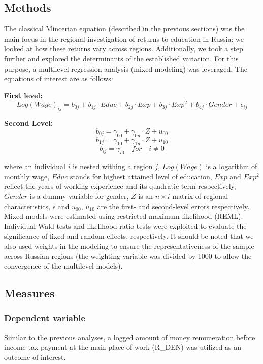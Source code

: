 \documentclass[12pt,a4paper]{article}
\numberwithin{equation}{section}
\begin{document}
\subsection*{Methods}

The classical Mincerian equation (described in the previous sections) was the main focus in the regional investigation of returns to education in Russia: we looked at how these returns vary across regions. Additionally, we took a step further and explored the determinants of the established variation. For this purpose, a multilevel regression analysis (mixed modeling) was leveraged. The equations of interest are as follows:

\textbf{First level:}
$$Log(Wage)_{ij} = b_{0j} + b_{1j}\cdot Educ + b_{2j}\cdot Exp + b_{3j}\cdot Exp^2 + b_{4j}\cdot Gender + \epsilon_{ij}$$

\textbf{Second Level:}
$$b_{0j} = \gamma_{00} + \gamma_{0n}\cdot Z + u_{00}$$
$$b_{1j} = \gamma_{10} + \gamma_{1n}\cdot Z + u_{10} $$
$$b_{ij} = \gamma_{i0} \quad for \quad i \neq 0$$

\noindent
where an individual $i$ is nested withing a region $j$, $Log(Wage)$ is a logarithm of monthly wage, $Educ$ stands for highest attained level of education, $Exp$ and $Exp^2$ reflect the years of working experience and its quadratic term respectively, $Gender$ is a dummy variable for gender, $Z$ is an $n\times i$ matrix of regional characteristics, $\epsilon$ and $u_{00}$, $u_{10}$ are the first- and second-level errors respectively.
\\

Mixed models were estimated using restricted maximum likelihood (REML). Individual Wald tests and likelihood ratio tests were exploited to evaluate the significance of fixed and random effects, respectively. It should be noted that we also used weights in the modeling to ensure the representativeness of the sample across Russian regions (the weighting variable was divided by 1000 to allow the convergence of the multilevel models). 

\subsection*{Measures}

\subsubsection*{Dependent variable}
Similar to the previous analyses, a logged amount of money remuneration before income tax payment at the main place of work (R\_DEN) was utilized as an outcome of interest.
\end{document}
